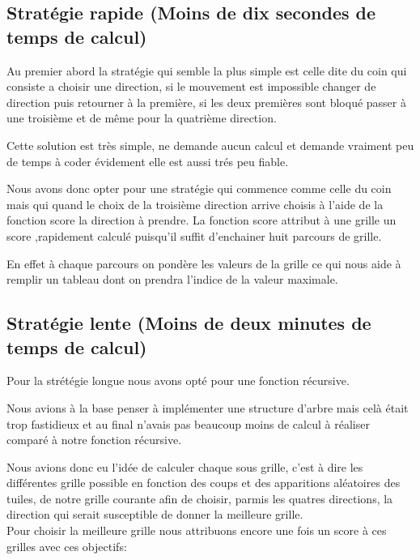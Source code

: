 \documentclass{article}
\begin{document}
  \subsection{Stratégie rapide (Moins de dix secondes de temps de calcul)}
  Au premier abord la stratégie qui semble la plus simple est celle dite du coin qui consiste a choisir une direction, si le mouvement est impossible changer de direction puis retourner à la première, si les deux premières sont bloqué passer à une troisième et de même pour la quatrième direction.

  Cette solution est très simple, ne demande aucun calcul et demande vraiment peu de temps à coder évidement elle est aussi trés peu fiable.

  Nous avons donc opter pour une stratégie qui commence comme celle du coin mais qui quand le choix de la troisième direction arrive choisis à l'aide de la fonction score la direction à prendre. La fonction score attribut à une grille un score ,rapidement calculé puisqu'il suffit d'enchainer huit parcours de grille.

  En effet à chaque parcours on pondère les valeurs de la grille ce qui nous aide à remplir un tableau dont on prendra l'indice de la valeur maximale.
  \subsection{Stratégie lente (Moins de deux minutes de temps de calcul)}

  Pour la strétégie longue nous avons opté pour une fonction récursive.

  Nous avions à la base penser à implémenter une structure d'arbre mais celà était trop fastidieux et au final n'avais pas beaucoup moins de calcul à réaliser comparé à notre fonction récursive.

  Nous avions donc eu l'idée de calculer chaque sous grille, c'est à dire les différentes grille possible en fonction des coups et des apparitions aléatoires des tuiles, de notre grille courante afin de choisir, parmis les quatres directions, la direction qui serait susceptible de donner la meilleure grille.
\\
  Pour choisir la meilleure grille nous attribuons encore une fois un score à ces grilles avec ces objectifs:
  \newline
  
\end{document}
